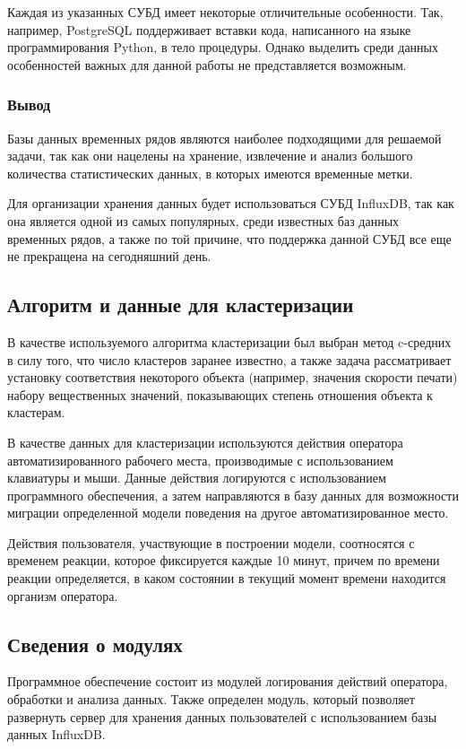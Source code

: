 Каждая из указанных СУБД имеет некоторые отличительные особенности. Так, например, PostgreSQL поддерживает вставки кода, написанного на языке программирования Python, в тело процедуры. Однако выделить среди данных особенностей важных для данной работы не представляется возможным.

\subsubsection*{Вывод}
Базы данных временных рядов являются наиболее подходящими для решаемой задачи, так как они нацелены на хранение, извлечение и анализ большого количества статистических данных, в которых имеются временные метки.

Для организации хранения данных будет использоваться СУБД InfluxDB, так как она является одной из самых популярных, среди известных баз данных временных рядов, а также по той причине, что поддержка данной СУБД все еще не прекращена на сегодняшний день.

\subsection{Алгоритм и данные для кластеризации}
В качестве используемого алгоритма кластеризации был выбран метод c-средних в силу того, что число кластеров заранее известно, а также задача рассматривает установку соответствия некоторого объекта (например, значения скорости печати) набору вещественных значений, показывающих степень отношения объекта к кластерам.

В качестве данных для кластеризации используются действия оператора автоматизированного рабочего места, производимые с использованием клавиатуры и мыши. Данные действия логируются с использованием программного обеспечения, а затем направляются в базу данных для возможности миграции определенной модели поведения на другое автоматизированное место.

Действия пользователя, участвующие в построении модели, соотносятся с временем реакции, которое фиксируется каждые 10 минут, причем по времени реакции определяется, в каком состоянии в текущий момент времени находится организм оператора.

\subsection{Сведения о модулях}
Программное обеспечение состоит из модулей логирования действий \newline оператора, обработки и анализа данных. Также определен модуль, который позволяет развернуть сервер для хранения данных пользователей с использованием базы данных InfluxDB.

